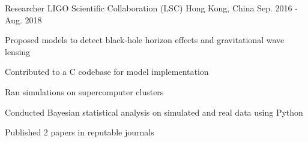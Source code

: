 \begin{cventries}
  \cventry
    {Researcher} %
    {LIGO Scientific Collaboration (LSC)} %
    {Hong Kong, China} %
    {Sep. 2016 - Aug. 2018} %
    {
      \begin{cvitems} %
        \item{Proposed models to detect black-hole horizon effects and gravitational wave lensing}
        \item{Contributed to a C codebase for model implementation}
        \item{Ran simulations on supercomputer clusters}
        \item{Conducted Bayesian statistical analysis on simulated and real data using Python}
        \item{Published 2 papers in reputable journals}
      \end{cvitems}
    }


\end{cventries}

